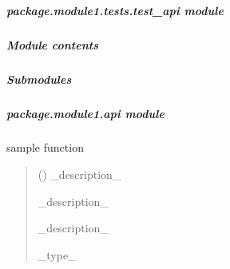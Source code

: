 \documentclass[letterpaper,10pt,dvipdfmx]{sphinxmanual}
\begin{document}
\subparagraph{package.module1.tests.test\_api module}
\label{\detokenize{package.module1.tests.test_api:package-module1-tests-test-api-module}}\label{\detokenize{package.module1.tests.test_api::doc}}

\subparagraph{Module contents}
\label{\detokenize{package.module1.tests:module-package.module1.tests}}\label{\detokenize{package.module1.tests:module-contents}}

\subparagraph{Submodules}
\label{\detokenize{package.module1:submodules}}
\sphinxstepscope


\subparagraph{package.module1.api module}
\label{\detokenize{package.module1.api:module-package.module1.api}}\label{\detokenize{package.module1.api:package-module1-api-module}}\label{\detokenize{package.module1.api::doc}}

\begin{fulllineitems}
\label{\detokenize{package.module1.api:package.module1.api.say_spam}}
\pysigstartsignatures
{}
\pysigstopsignatures
\sphinxAtStartPar
sample function
\begin{quote}\begin{description}
\sphinxAtStartPar
{} () \sphinxhyphen{}\sphinxhyphen{} \_description\_

\sphinxAtStartPar
{} \sphinxhyphen{}\sphinxhyphen{} \_description\_

\sphinxAtStartPar
\_description\_

\sphinxAtStartPar
\_type\_

\end{description}\end{quote}

\end{fulllineitems}
\end{document}
